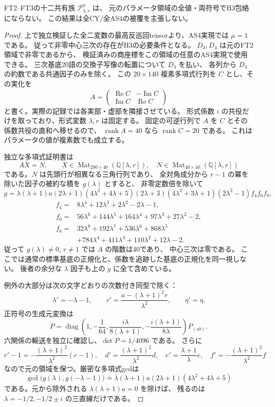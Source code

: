 \begin{theorem}\label{thm:cubic-full-P-excluded}
FT2--FT3の十二共有族 $\mathcal P^\eta_{\lambda,r}$ は、
元のパラメータ領域の全値・両符号でH3包絡にならない。
この結果は全CY/全AS4の被覆を主張しない。
\end{theorem}
\begin{proof}
上で独立検証した全二変数の最高反巡回tensorより、AS4実現では $\mu=1$ である。
従って非零中心三次の存在がH3の必要条件となる。
$D_3,D_4$ は元のFT2領域で非零であるから、
検証済みの商座標をこの領域の任意のAS4実現で使用できる。
三次基底20語の交換子写像の転置について $D_4$ を払い、
各列から $D_4$ の約数である共通因子のみを除く。
この $20\times140$ 複素多項式行列を $C$ とし、その実化を
\[
 A=\begin{pmatrix}\operatorname{Re}C&-\operatorname{Im}C\\
 \operatorname{Im}C&\operatorname{Re}C\end{pmatrix}
\]
と書く。実際の記録では各実部・虚部を隣接させている。
形式係数 $i$ の共役だけを取っており、形式変数 $\lambda,r$ は固定する。
固定の可逆行列で $A$ を $C$ とその係数共役の直和へ移せるので、
$\operatorname{rank}A=40$ なら $\operatorname{rank}C=20$ である。
これはパラメータの値が複素数でも成立する。

独立な多項式証明書は
\[
 AX=N,\qquad X\in\operatorname{Mat}_{280\times40}(\mathbb Q[\lambda,r]),
 \quad N\in\operatorname{Mat}_{40\times40}(\mathbb Q[\lambda,r])
\]
である。$N$ は先頭行が相異なる三角行列であり、
全対角成分から $r-1$ の冪を除いた因子の被約な積を $g(\lambda)$ とすると、
非零定数倍を除いて
\[
 g=\lambda(\lambda+1)a(2\lambda+1)(4\lambda^2+4\lambda+5)
 (2\lambda+3)(4\lambda^2+3\lambda+1)(2\lambda^2-1)f_4 f_6 f_8,
\]
\begin{align*}
 f_4={}&8\lambda^4+12\lambda^3+2\lambda^2-2\lambda-1,\\
 f_6={}&56\lambda^6+144\lambda^5+164\lambda^4+97\lambda^3+27\lambda^2-2,\\
 f_8={}&32\lambda^8+192\lambda^7+536\lambda^6+868\lambda^5\\
       &+784\lambda^4+411\lambda^3+110\lambda^2+12\lambda-2.
\end{align*}
従って $g(\lambda)\ne0$, $r\ne1$ では $A$ の階数は40であり、
中心三次は零である。
ここでは通常の標準基底の正規化と、係数を追跡した基底の正規化を同一視しない。
後者の余分な $\lambda$ 因子も上の $g$ に全て含めている。

例外の大部分は次の文字どおりの次数付き同型で除く：
\[
 \lambda'=-\lambda-1,\qquad
 r'=\frac{a-(\lambda+1)^2r}{\lambda^2},\qquad \eta'=\eta.
\]
正符号の生成元変換は
\[
 P=\operatorname{diag}\left(1,-\frac1{64},
 \frac{i\lambda}{8(\lambda+1)},-\frac{i(\lambda+1)}{8\lambda}\right)P_{(ab)}.
\]
六関係の輸送を独立に確認し、$\det P=1/4096$ である。
さらに
\[
 r'-1=-\frac{(\lambda+1)^2}{\lambda^2}(r-1),\quad
 d'=\frac{(\lambda+1)^2}{\lambda^2}d,\quad
 e'=\frac{\lambda+1}{\lambda}e,\quad
 f'=-\frac{(\lambda+1)^2}{\lambda^2}f
\]
なので元の領域を保つ。厳密な多項式gcdは
\[
 \gcd\bigl(g(\lambda),g(-\lambda-1)\bigr)
 \doteq\lambda(\lambda+1)a(2\lambda+1)(4\lambda^2+4\lambda+5)
\]
である。元から除外される $\lambda(\lambda+1)a=0$ を除けば、
残るのは $\lambda=-1/2,-1/2\pm i$ の三直線だけである。


\end{proof}
